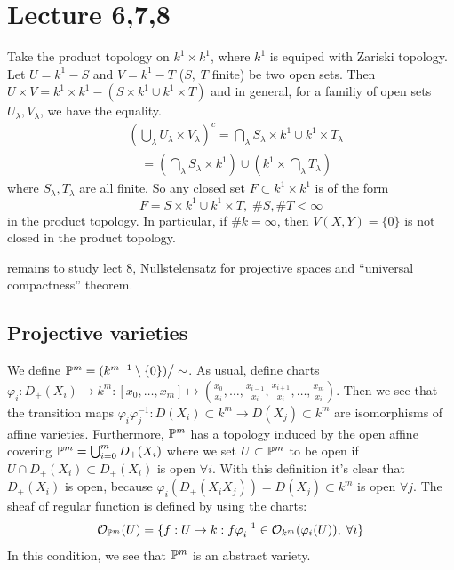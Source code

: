 \section{Lecture 6,7,8}
\begin{remark}
    Take the product topology on $k^1\times k^1$, where $k^1$ is equiped with Zariski topology. Let 
    $U=k^1-S$ and $V=k^1-T$ ($S,\;T$ finite) be two open sets. Then 
    $U\times V = k^1\times k^1 - (S\times k^1\cup k^1\times T)$ and in general, for a familiy of open sets 
    $U_\lambda, V_\lambda$, we have the equality.
    \begin{equation}
    \begin{split}
    &(\bigcup_\lambda U_\lambda\times V_\lambda)^c = \bigcap_\lambda S_\lambda\times k^1\cup k^1\times T_\lambda\\
    &\quad=(\bigcap_\lambda S_\lambda\times k^1)\cup (k^1\times \bigcap_\lambda T_\lambda)    
    \end{split}
    \end{equation}
    where $S_\lambda, T_\lambda$ are all finite. So any closed set $F\subset k^1\times k^1$ is of the form 
    \begin{equation}
        F = S\times k^1 \cup k^1\times T,\; \#S,\#T<\infty
    \end{equation}
    in the product topology. In particular, if $\# k =\infty$, then $V(X,Y)=\{0\}$ is not closed in the product topology.
\end{remark}

\TODO remains to study lect 8, Nullstelensatz for projective spaces and ``universal compactness'' theorem.
\subsection{Projective varieties}
We define $\mathbb{P}^m = (k^{m+1}\setminus\{0\}) \big/\sim$. As usual, define charts 
$\varphi_i: D_+(X_i)\to k^{m}: [x_0,\dots,x_m]\mapsto 
(\frac{x_0}{x_i},\dots,\frac{x_{i-1}}{x_i},\frac{x_{i+1}}{x_i},\dots,\frac{x_m}{x_i})$. Then we see that the transition maps 
$\varphi_i\varphi_j^{-1}: D(X_i)\subset k^m\to D(X_j)\subset k^m$ are isomorphisms of affine varieties. 
Furthermore, $\mathbb{P}^m$ has a topology induced by the open affine covering $\mathbb{P}^m =\bigcup_{i=0}^mD_+(X_i)$ where we set 
$U\subset\mathbb{P}^m$ to be open if $U\cap D_+(X_i)\subset D_+(X_i)$ is open $\forall i$. With this definition it's clear 
that $D_+(X_i)$ is open, because $\varphi_i(D_+(X_iX_j))= D(X_j)\subset k^m$ is open $\forall j$. The sheaf of regular 
function is defined by using the charts:
\begin{equation}
    \mathcal{O}_{\mathbb{P}^m}(U)=\{f:U\to k: f\varphi_i^{-1}\in\mathcal{O}_{k^m}(\varphi_i(U)),\;\forall i\}
\end{equation}
In this condition, we see that $\mathbb{P}^m$ is an abstract variety.

